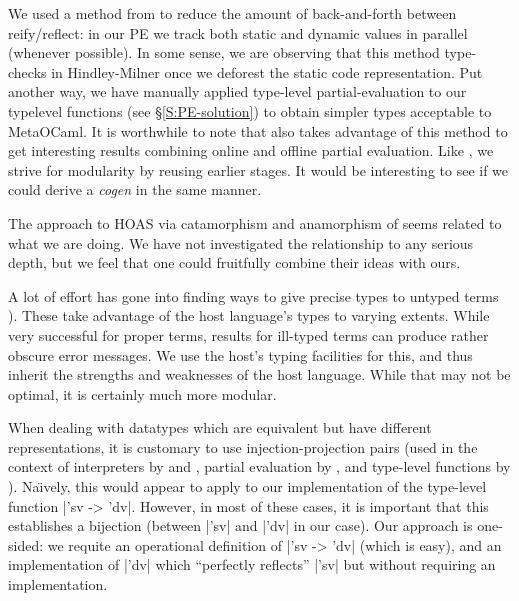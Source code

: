 \documentclass[preprint]{sigplanconf}
\begin{document}
We used a method from \citet{asai-binding-time} to reduce the amount
of back-and-forth between reify/reflect: in our PE we track both
static and dynamic values in parallel (whenever possible).  In some sense,
we are observing that this method type-checks in Hindley-Milner once we
deforest the static code representation.  Put another way, we have
manually applied type-level partial-evaluation to our typelevel 
functions (see \S\ref{S:PE-solution}) to obtain simpler types 
acceptable to MetaOCaml.  It is worthwhile to note that 
\citet{sumii-hybrid} also takes advantage of this method
\citep[of][]{asai-binding-time} to get interesting results combining online
and offline partial evaluation.  Like \citet{SperberThiemann:TwoForOne},
we strive for modularity by reusing earlier stages.  It would be interesting
to see if we could derive a \emph{cogen} \citep{Thiemann:cogeninsixlines}
in the same manner.

The approach to HOAS via catamorphism and anamorphism of
\citet{Washburn-Weirich-boxes} seems related to what we are doing.
We have not investigated the relationship to any serious depth, but we
feel that one could fruitfully combine their ideas with ours.

A lot of effort has gone into finding ways to give precise types to untyped
terms \citep{baars-typing,Guillemette-Monier-PLPV,haskell-list}).  These 
take advantage of the host language's types to varying extents.  While
very successful for proper terms, results for
ill-typed terms can produce rather obscure error messages.  We use the
host's typing facilities for this, and thus inherit the strengths
and weaknesses of the host language.  While that may not be optimal, it is
certainly much more modular.

When dealing with datatypes which are equivalent but have different
representations, it is customary to use injection-projection pairs
(used in the context of interpreters by \citet{Ramsey-ML-module-mania}
and \citet{Benton-embedded-interpreters}, partial evaluation by
\citet{Danvy-TDPE}, and type-level functions by
\citet{oliveira-typecase}).  Na\"{\i}vely, this would appear to apply to
our implementation of the type-level function |'sv -> 'dv|.  However, in most
of these cases, it is important that this establishes a bijection (between
|'sv| and |'dv| in our case).  Our approach is one-sided: we requite
an operational definition of |'sv -> 'dv| (which is easy), and an
implementation of |'dv| which ``perfectly reflects'' |'sv| but without 
requiring an implementation.
\end{document}

